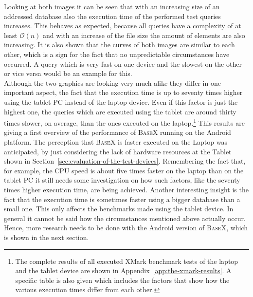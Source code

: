 Looking at both images it can be seen that with an increasing size of an addressed database also the execution time of the performed test queries increases.
This behaves as expected, because all queries have a complexity of at least $\mathcal O(n)$ and with an increase of the file size the amount of elements are also increasing.
It is also shown that the curves of both images are similar to each other, which is a sign for the fact that no unpredictable circumstances have occurred.
A query which is very fast on one device and the slowest on the other or vice versa would be an example for this.\\
Although the two graphics are looking very much alike they differ in one important aspect, the fact that the execution time is up to seventy times higher using the tablet PC instead of the laptop device.
Even if this factor is just the highest one, the queries which are executed using the tablet are around thirty times slower, on average, than the ones executed on the laptop.\footnote{The complete results of all executed XMark benchmark tests of the laptop and the tablet device are shown in Appendix~\ref{app:the-xmark-results}. A specific table is also given which includes the factors that show how the various execution times differ from each other.}
This results are giving a first overview of the performance of \textsc{BaseX} running on the Android platform.
The perception that \textsc{BaseX} is faster executed on the Laptop was anticipated, by just considering the lack of hardware resources at the Tablet shown in Section~\ref{sec:evaluation-of-the-test-devices}.
Remembering the fact that, for example, the CPU speed is about five times faster on the laptop than on the tablet PC it still needs some investigation on how such factors, like the seventy times higher execution time, are being achieved.
Another interesting insight is the fact that the execution time is sometimes faster using a bigger database than a small one.
This only affects the benchmarks made using the tablet device.
In general it cannot be said how the circumstances mentioned above actually occur.
Hence, more research needs to be done with the Android version of \textsc{BaseX}, which is shown in the next section.

